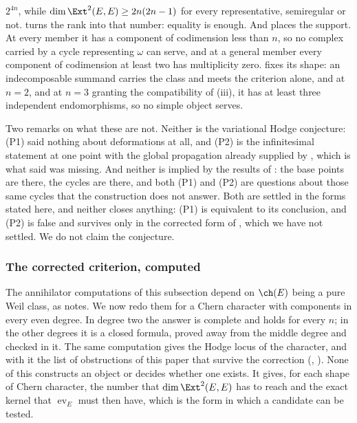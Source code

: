 \begin{remark}
\begin{enumerate}[label=\textup{(P\arabic*)},leftmargin=*]
  $2^{4n}$, while $\dim\Ext^{2}(E,E)\ge2n(2n-1)$ for every representative,
  semiregular or not.  turns the rank into that number:
  equality is enough. And  places the support. At every
  member it has a component of codimension less than $n$, so no complex
  carried by a cycle representing $\omega$ can serve, and at a general member
  every component of codimension at least two has multiplicity zero.
   fixes its shape: an indecomposable summand carries the
  class and meets the criterion alone, and at $n=2$, and at $n=3$ granting
  the compatibility of (iii), it has at least three
  independent endomorphisms, so no simple object serves.
\end{enumerate}

Two remarks on what these are not. Neither is the variational Hodge
conjecture: (P1) said nothing about deformations at all, and (P2) is the
infinitesimal statement at one point with the global propagation already
supplied by , which is what  said
was missing. And neither is implied by the results of
: the base points are there, the cycles are there, and
both (P1) and (P2) are questions about those same cycles that the construction
does not answer. Both are settled in the forms stated here, and neither
closes anything: (P1) is equivalent to its conclusion, and (P2) is false and
survives only in the corrected form of , which we have not
settled. We do not claim the conjecture.
\end{remark}

\subsubsection*{The corrected criterion, computed}

The annihilator computations of this subsection depend on $\ch(E)$ being a
pure Weil class, as  notes. We now redo them for a Chern character with components in every
even degree. In degree two the answer is complete and holds for every $n$;
in the other degrees it is a closed formula, proved away from the middle
degree and checked in it. The same computation gives the Hodge locus of the
character, and with it the list of obstructions of this paper that survive
the correction (, ). None
of this constructs an object or decides
whether one exists. It gives, for each shape of Chern character, the number
that $\dim\Ext^{2}(E,E)$ has to reach and the exact kernel that
$\operatorname{ev}_{E}$ must then have, which is the form in which a
candidate can be tested.


